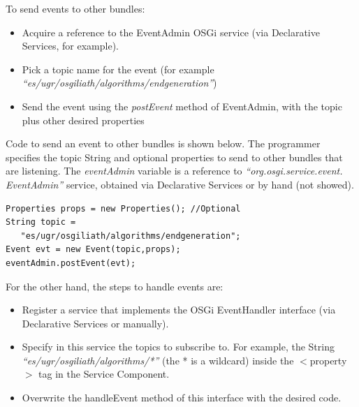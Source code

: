\documentclass{sig-alternate}
\begin{document}

To send events to other bundles:
\begin{itemize}
\item Acquire a reference to the EventAdmin OSGi service (via Declarative Services, for example).
\item Pick a topic name for the event (for example {\em ``es/ugr/osgiliath/algorithms/endgeneration''})
\item Send the event using the {\em postEvent} method of EventAdmin, with the topic plus other desired properties %
\end{itemize}

Code to send an event to other bundles is shown below. The programmer specifies the topic String and optional properties to send to other bundles that are listening. The {\em eventAdmin} variable is a reference to {\em ``org.osgi.service.event. EventAdmin''} service, obtained via Declarative Services or by hand (not showed).

\begin{lstlisting}
Properties props = new Properties(); //Optional
String topic = 
   "es/ugr/osgiliath/algorithms/endgeneration";
Event evt = new Event(topic,props);
eventAdmin.postEvent(evt);
\end{lstlisting}
		
For the other hand, the steps to handle events are:
\begin{itemize}
\item Register a service that implements the OSGi EventHandler interface (via Declarative Services or manually).
\item Specify in this service the topics to subscribe to. For example, the String {\em ``es/ugr/osgiliath/algorithms/*''} (the * is a wildcard) inside the $<$property$>$ tag in the Service Component.
\item Overwrite the handleEvent method of this interface with the desired code.
\end{itemize}
\end{document}
